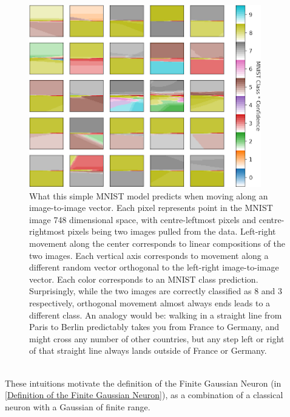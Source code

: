 \documentclass[12pt,oneside]{CUNY_PhD}
\begin{document}
\begin{figure}[!htbp]
    \centering
    \includegraphics[width=0.9\textwidth]{images/Motivation/boundaries.png}
    \caption{What this simple MNIST model predicts when moving along an image-to-image vector. Each pixel represents point in the MNIST image 748 dimensional space, with centre-leftmost pixels and centre-rightmost pixels being two images pulled from the data. Left-right movement along the center corresponds to linear compositions of the two images. Each vertical axis corresponds to movement along a different random vector orthogonal to the left-right image-to-image vector. Each color corresponds to an MNIST class prediction. Surprisingly, while the two images are correctly classified as 8 and 3 respectively, orthogonal movement almost always ends leads to a different class. An analogy would be: walking in a straight line from Paris to Berlin predictably takes you from France to Germany, and might cross any number of other countries, but any step left or right of that straight line always lands outside of France or Germany. }
    \label{fig:mot-bounds}
\end{figure}\\
These intuitions motivate the definition of the Finite Gaussian Neuron (in \ref{Definition of the Finite Gaussian Neuron}), as a combination of a classical neuron with a Gaussian of finite range. 
\end{document}
